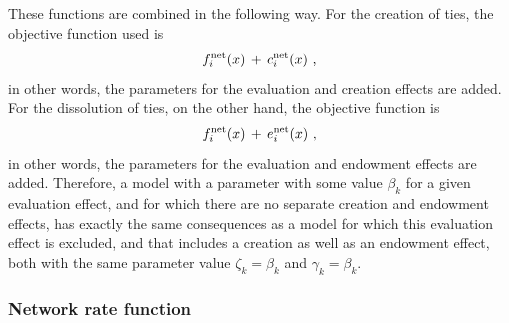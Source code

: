 \documentclass[a4paper,fleqn,11pt]{article}
\newcommand{\+}{\, + \,}
\begin{document}
These functions are combined in the following way.
For the creation of ties, the objective function used is
\begin{equation}
f_i^{\rm net}(x) \,+\, c_i^{\rm net}(x)     \ ,             \label{fc_net}
\end{equation}
in other words, the parameters for the evaluation and creation effects are
added.
For the dissolution of ties, on the other hand, the objective function is
\begin{equation}
f_i^{\rm net}(x) \,+\, e_i^{\rm net}(x)      \ ,            \label{fe_net}
\end{equation}
in other words, the parameters for the evaluation and endowment effects are
added.
Therefore, a model with a parameter with some value $\beta_k$
for a given evaluation effect,
and for which there are no separate creation and endowment effects,
has exactly the same consequences as a model for which this
evaluation effect is excluded, and that includes a creation as well as
an endowment effect, both with the same parameter value
$\zeta_k = \beta_k$ and $\gamma_k = \beta_k$.


\subsubsection{Network rate function} \label{S_r}
\end{document}
